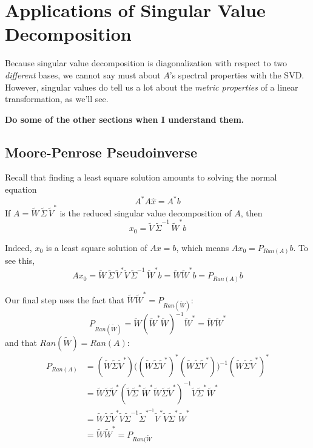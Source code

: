 \documentclass[a4paper,10pt]{book}
\theoremstyle{plain}
\theoremstyle{plain}
\theoremstyle{definition}
\begin{document}
\section{Applications of Singular Value Decomposition}

Because singular value decomposition is diagonalization with respect to two \textit{different} bases, we cannot say must about $A$'s spectral properties with the SVD. However, singular values do tell us a lot about the \textit{metric properties} of a linear transformation, as we'll see. 

\textbf{Do some of the other sections when I understand them.}

\subsection{Moore-Penrose Pseudoinverse}

Recall that finding a least square solution amounts to solving the normal equation 
$$A^{*} A \hat{x} = A^{*} b$$
If $A = \widetilde{W} \, \widetilde{\Sigma} \, \widetilde{V}^{*}$ is the reduced singular value decomposition of $A$, then 
$$ x_{0} = \widetilde{V} \, \widetilde{\Sigma}^{-1} \, \widetilde{W}^{*} b$$

Indeed, $x_{0}$ is a least square solution of $Ax = b$, which means $Ax_{0} = P_{Ran(A)} b$. To see this, 
$$Ax_{0} = \widetilde{W} \, \widetilde{\Sigma} \, \widetilde{V}^{*} \widetilde{V} \, \widetilde{\Sigma}^{-1} \, \widetilde{W}^{*} b = \widetilde{W} \widetilde{W}^{*} b = P_{Ran(A)} b $$

Our final step uses the fact that $\widetilde{W} \widetilde{W}^{*} = P_{Ran(\widetilde{W})}$: 
$$P_{Ran(\widetilde{W})} = \widetilde{W} (\widetilde{W}^{*} \widetilde{W})^{-1} \widetilde{W}^{*} = \widetilde{W} \widetilde{W}^{*}$$
and that $Ran(\widetilde{W}) = Ran(A)$:
$$
\begin{aligned}
P_{Ran(A)} &= (\widetilde{W} \widetilde{\Sigma} \widetilde{V}^{*}) \big( (\widetilde{W} \widetilde{\Sigma} \widetilde{V}^{*})^{*} (\widetilde{W} \widetilde{\Sigma} \widetilde{V}^{*}) \big)^{-1} (\widetilde{W} \widetilde{\Sigma} \widetilde{V}^{*})^{*} \\
&= \widetilde{W} \widetilde{\Sigma} \widetilde{V}^{*} ( \widetilde{V} \widetilde{\Sigma}^{*} \widetilde{W}^{*} \widetilde{W} \widetilde{\Sigma} \widetilde{V}^{*} )^{-1} \widetilde{V} \widetilde{\Sigma}^{*} \widetilde{W}^{*} \\
&= \widetilde{W} \widetilde{\Sigma} \widetilde{V}^{*} \widetilde{V} \widetilde{\Sigma}^{-1} \widetilde{\Sigma}^{*^{-1}} \widetilde{V}^{*}  \widetilde{V} \widetilde{\Sigma}^{*} \widetilde{W}^{*} \\
&= \widetilde{W} \widetilde{W}^{*} = P_{Ran(\widetilde{W}}
\end{aligned}
$$
\end{document}
